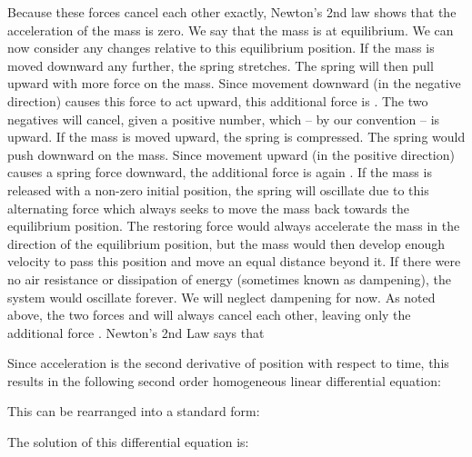 \documentclass{ximera}
\begin{document}
Because these forces cancel each other exactly, Newton’s 2nd law shows that the acceleration of the mass is zero.  We say that the mass is at equilibrium.  We can now consider any changes relative to this equilibrium position.
If the mass is moved downward any further, the spring stretches.  The spring will then pull upward with more force on the mass.  Since movement downward (in the negative  direction) causes this force to act upward, this additional force is .  The two negatives will cancel, given a positive number, which – by our convention – is upward.  
If the mass is moved upward, the spring is compressed.  The spring would push downward on the mass.  Since movement upward (in the positive  direction) causes a spring force downward, the additional force is again .  
If the mass is released with a non-zero initial position, the spring will oscillate due to this alternating force which always seeks to move the mass back towards the equilibrium position.  The restoring force would always accelerate the mass in the direction of the equilibrium position, but the mass would then develop enough velocity to pass this position and move an equal distance beyond it.  If there were no air resistance or dissipation of energy (sometimes known as dampening), the system would oscillate forever.  We will neglect dampening for now.
As noted above, the two forces  and  will always cancel each other, leaving only the additional force .  Newton’s 2nd Law says that 

Since acceleration is the second derivative of position with respect to time, this results in the following second order homogeneous linear differential equation:

This can be rearranged into a standard form:

The solution of this differential equation is:
\end{document}

